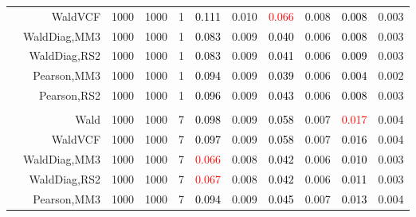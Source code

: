\documentclass[
]{article}
\begin{document}
\begin{table}[H]
{\begin{tabular}[t]{lrrrrrrrlrr}
\hspace{1em} & WaldVCF & 1000 & 1000 & 1 & \textcolor{black}{0.111} & 0.010 & \textcolor{red}{0.066} & 0.008 & \textcolor{black}{0.008} & 0.003\\

\hspace{1em} & WaldDiag,MM3 & 1000 & 1000 & 1 & \textcolor{black}{0.083} & 0.009 & \textcolor{black}{0.040} & 0.006 & \textcolor{black}{0.008} & 0.003\\

\hspace{1em} & WaldDiag,RS2 & 1000 & 1000 & 1 & \textcolor{black}{0.083} & 0.009 & \textcolor{black}{0.041} & 0.006 & \textcolor{black}{0.009} & 0.003\\

\hspace{1em} & Pearson,MM3 & 1000 & 1000 & 1 & \textcolor{black}{0.094} & 0.009 & \textcolor{black}{0.039} & 0.006 & \textcolor{black}{0.004} & 0.002\\

\hspace{1em} & Pearson,RS2 & 1000 & 1000 & 1 & \textcolor{black}{0.096} & 0.009 & \textcolor{black}{0.043} & 0.006 & \textcolor{black}{0.008} & 0.003\\
\cmidrule{1-11}
\addlinespace[0.3em]
\multicolumn{11}{l}{\textbf{1F 15V}}\\
\hspace{1em} & Wald & 1000 & 1000 & 7 & \textcolor{black}{0.098} & 0.009 & \textcolor{black}{0.058} & 0.007 & \textcolor{red}{0.017} & 0.004\\

\hspace{1em} & WaldVCF & 1000 & 1000 & 7 & \textcolor{black}{0.097} & 0.009 & \textcolor{black}{0.058} & 0.007 & \textcolor{black}{0.016} & 0.004\\

\hspace{1em} & WaldDiag,MM3 & 1000 & 1000 & 7 & \textcolor{red}{0.066} & 0.008 & \textcolor{black}{0.042} & 0.006 & \textcolor{black}{0.010} & 0.003\\

\hspace{1em} & WaldDiag,RS2 & 1000 & 1000 & 7 & \textcolor{red}{0.067} & 0.008 & \textcolor{black}{0.042} & 0.006 & \textcolor{black}{0.011} & 0.003\\

\hspace{1em} & Pearson,MM3 & 1000 & 1000 & 7 & \textcolor{black}{0.094} & 0.009 & \textcolor{black}{0.045} & 0.007 & \textcolor{black}{0.013} & 0.004\\


\end{tabular}}
\end{table}
\end{document}
